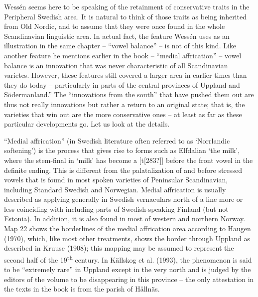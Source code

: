 Wessén seems here to be speaking of the retainment of conservative traits in the Peripheral Swedish area. It is natural to think of those traits as being inherited from Old Nordic, and to assume that they were once found in the whole Scandinavian linguistic area. In actual fact, the feature Wessén uses as an illustration in the same chapter – “vowel balance” – is not of this kind. Like another feature he mentions earlier in the book – “medial affrication” – vowel balance is an innovation that was never characteristic of all Scandinavian varietes.  However, these features still covered a larger area in earlier times than they do today – particularly in parts of the central provinces of Uppland and Södermanland.” The “innovations from the south” that have pushed them out are thus not really innovations but rather a return to an original state; that is, the varieties that win out are the more conservative ones – at least as far as these particular developments go. Let us look at the details.

“Medial affrication” (in Swedish literature often referred to as  ‘Norrlandic softening’) is the process that gives rise to forms such as Elfdalian  ‘the milk’, where the stem-final  in  ‘milk’ has become a [t[283?]] before the front vowel in the definite ending. This is different from the palatalization of  and  before stressed vowels that is found in most spoken varieties of Peninsular Scandinavian, including Standard Swedish and Norwegian. Medial affrication is usually described as applying generally in Swedish vernaculars north of a line more or less coinciding with  including parts of Swedish-speaking Finland (but not Estonia). In addition, it is also found in most of western and northern Norway. Map 22 shows the borderlines of the medial affrication area according to Haugen (1970), which, like most other treatments, shows the border through Uppland as described in Kruuse (1908); this mapping may be assumed to represent the second half of the 19\textsuperscript{th} century. In Källskog et al. (1993), the phenomenon is said to be “extremely rare” in Uppland except in the very north and is judged by the editors of the volume to be disappearing in this province – the only attestation in the texts in the book is from the parish of Hållnäs. 

